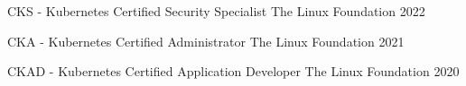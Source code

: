 

\begin{cvhonors}

  \cvhonor
    {CKS - Kubernetes Certified Security Specialist} %
    {The Linux Foundation} %
    {} %
    {2022} %

  \cvhonor
    {CKA - Kubernetes Certified Administrator} %
    {The Linux Foundation} %
    {} %
    {2021} %

  \cvhonor
    {CKAD - Kubernetes Certified Application Developer} %
    {The Linux Foundation} %
    {} %
    {2020} %

\end{cvhonors}
